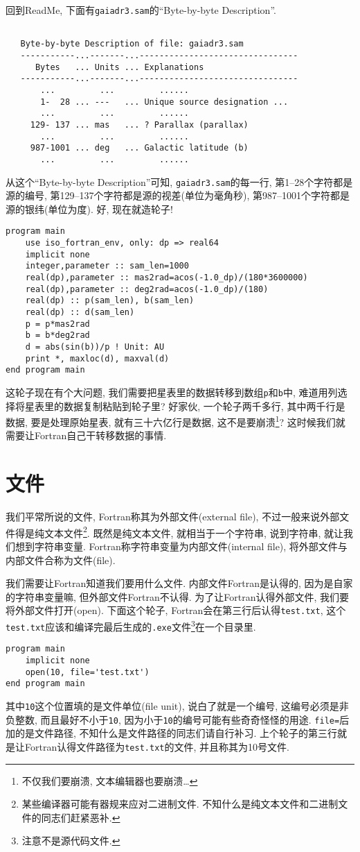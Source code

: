 回到ReadMe, 下面有\verb|gaiadr3.sam|的``Byte-by-byte Description''.
\begin{verbatim}

   Byte-by-byte Description of file: gaiadr3.sam
   -----------...-------...--------------------------------
      Bytes   ... Units ... Explanations
   -----------...-------...--------------------------------
       ...         ...         ......
       1-  28 ... ---   ... Unique source designation ...
       ...         ...         ......
     129- 137 ... mas   ... ? Parallax (parallax)
       ...         ...         ......
     987-1001 ... deg   ... Galactic latitude (b)
       ...         ...         ......
\end{verbatim}
从这个``Byte-by-byte Description''可知, \verb|gaiadr3.sam|的每一行, 第1--28个字符都是源的编号, 第129--137个字符都是源的视差(单位为毫角秒), 第987--1001个字符都是源的银纬(单位为度). 好, 现在就造轮子!\label{gaiadr3.sam}
\begin{verbatim}
program main
    use iso_fortran_env, only: dp => real64
    implicit none
    integer,parameter :: sam_len=1000
    real(dp),parameter :: mas2rad=acos(-1.0_dp)/(180*3600000)
    real(dp),parameter :: deg2rad=acos(-1.0_dp)/(180)
    real(dp) :: p(sam_len), b(sam_len)
    real(dp) :: d(sam_len)
    p = p*mas2rad
    b = b*deg2rad
    d = abs(sin(b))/p ! Unit: AU
    print *, maxloc(d), maxval(d)
end program main
\end{verbatim}
这轮子现在有个大问题, 我们需要把星表里的数据转移到数组\verb|p|和\verb|b|中, 难道用列选择将星表里的数据复制粘贴到轮子里? 好家伙, 一个轮子两千多行, 其中两千行是数据, 要是处理原始星表, 就有三十六亿行是数据, 这不是要崩溃\footnote{不仅我们要崩溃, 文本编辑器也要崩溃\dots}? 这时候我们就需要让Fortran自己干转移数据的事情.

\section{文件}

我们平常所说的文件, Fortran称其为外部文件(external file), 不过一般来说外部文件得是纯文本文件\footnote{某些编译器可能有器规来应对二进制文件. 不知什么是纯文本文件和二进制文件的同志们赶紧恶补.}. 既然是纯文本文件, 就相当于一个字符串, 说到字符串, 就让我们想到字符串变量. Fortran称字符串变量为内部文件(internal file), 将外部文件与内部文件合称为文件(file).

我们需要让Fortran知道我们要用什么文件. 内部文件Fortran是认得的, 因为是自家的字符串变量嘛, 但外部文件Fortran不认得. 为了让Fortran认得外部文件, 我们要将外部文件打开(open). 下面这个轮子, Fortran会在第三行后认得\verb|test.txt|, 这个\verb|test.txt|应该和编译完最后生成的\verb|.exe|文件\footnote{注意不是源代码文件.}在一个目录里.
\begin{verbatim}
program main
    implicit none
    open(10, file='test.txt')
end program main
\end{verbatim}
其中\verb|10|这个位置填的是文件单位(file unit), 说白了就是一个编号, 这编号必须是非负整数, 而且最好不小于\verb|10|, 因为小于\verb|10|的编号可能有些奇奇怪怪的用途. \verb|file=|后加的是文件路径, 不知什么是文件路径的同志们请自行补习. 上个轮子的第三行就是让Fortran认得文件路径为\verb|test.txt|的文件, 并且称其为10号文件.

